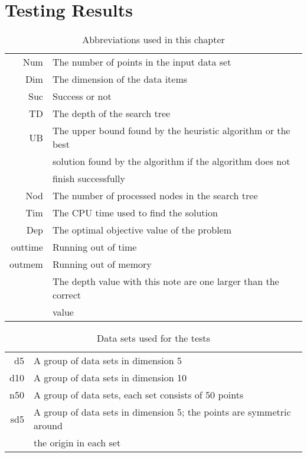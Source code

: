 \appendix

\chapter{Testing Results}
\label{chap:apd}

\begin{table}[!htb]
  \centering
  \begin{tabular}[center]{|r|l|}
    \hline
    Num & The number of points in the input data set \\
    Dim & The dimension of the data items \\
    Suc & Success or not \\
    TD & The depth of the search tree \\
    UB & The upper bound found by the heuristic algorithm or the best\\
    &solution found by the algorithm if the algorithm does not\\
    &finish successfully \\
    Nod & The number of processed nodes in the search tree \\
    Tim & The CPU time used to find the solution \\
    Dep & The optimal objective value of the problem \\
    outtime & Running out of time\\
    outmem & Running out of memory\\
     & The depth value with this note are one larger than the correct\\
    &value\\
    \hline
  \end{tabular}
  \caption{Abbreviations used in this chapter}
  \label{tab:test.abb}
\end{table}

\begin{table}[!htb]
  \centering
  \begin{tabular}[center]{|r|l|}
    \hline
    d5 & A group of data sets in dimension 5\\
    d10 & A group of data sets in dimension 10\\
    n50 & A group of data sets, each set consists of 50 points\\
    sd5 & A group of data sets in dimension 5; the points are symmetric around\\
        & the origin in each set\\
    \hline
  \end{tabular}
  \caption{Data sets used for the tests}
  \label{tab:test.datasets}
\end{table}

